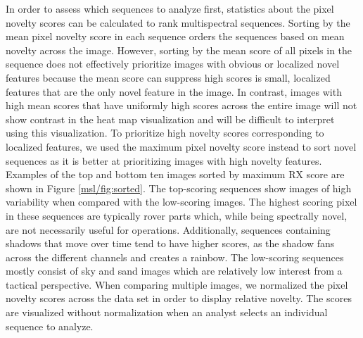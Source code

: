 In order to assess which sequences to analyze first, statistics about the pixel novelty scores can be calculated to rank multispectral sequences. 
Sorting by the mean pixel novelty score in each sequence orders the sequences based on mean novelty across the image.
However, sorting by the mean score of all pixels in the sequence does not effectively prioritize images with obvious or localized novel features because the mean score can suppress high scores is small, localized features that are the only novel feature in the image. 
In contrast, images with high mean scores that have uniformly high scores across the entire image will not show contrast in the heat map visualization and will be difficult to interpret using this visualization. 
To prioritize high novelty scores corresponding to localized features, we used the maximum pixel novelty score instead to sort novel sequences as it is better at prioritizing images with high novelty features. 
Examples of the top and bottom ten images sorted by maximum RX score are shown in Figure \ref{msl/fig:sorted}. 
The top-scoring sequences show images of high variability when compared with the low-scoring images. 
The highest scoring pixel in these sequences are typically rover parts which, while being spectrally novel, are not necessarily useful for operations.
Additionally, sequences containing shadows that move over time tend to have higher scores, as the shadow fans across the different channels and creates a rainbow.
The low-scoring sequences mostly consist of sky and sand images which are relatively low interest from a tactical perspective. 
When comparing multiple images, we normalized the pixel novelty scores across the data set in order to display relative novelty. 
The scores are visualized without normalization when an analyst selects an individual sequence to analyze. 

